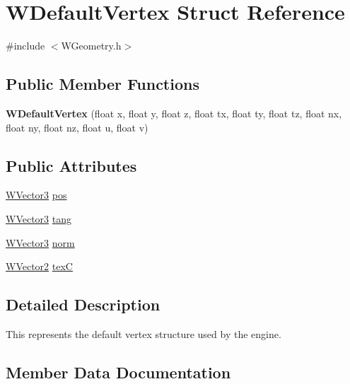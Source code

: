 \hypertarget{struct_w_default_vertex}{}\section{W\+Default\+Vertex Struct Reference}
\label{struct_w_default_vertex}


{\ttfamily \#include $<$W\+Geometry.\+h$>$}

\subsection*{Public Member Functions}
\begin{DoxyCompactItemize}
\item 
{\bfseries W\+Default\+Vertex} (float x, float y, float z, float tx, float ty, float tz, float nx, float ny, float nz, float u, float v)\hypertarget{struct_w_default_vertex_a119df88c3ef93fd08ce657af30c08669}{}\label{struct_w_default_vertex_a119df88c3ef93fd08ce657af30c08669}

\end{DoxyCompactItemize}
\subsection*{Public Attributes}
\begin{DoxyCompactItemize}
\item 
\hyperlink{class_w_vector3}{W\+Vector3} \hyperlink{struct_w_default_vertex_afdcf7f42cc5581df2f6952aaf839e8bb}{pos}
\item 
\hyperlink{class_w_vector3}{W\+Vector3} \hyperlink{struct_w_default_vertex_a2220549f6c898e6fdc5f534630c44796}{tang}
\item 
\hyperlink{class_w_vector3}{W\+Vector3} \hyperlink{struct_w_default_vertex_a60a322ede7963e1e4a3f6e031c303ffa}{norm}
\item 
\hyperlink{class_w_vector2}{W\+Vector2} \hyperlink{struct_w_default_vertex_a3e58deb0c88b8adaa8423aebd8427172}{texC}
\end{DoxyCompactItemize}


\subsection{Detailed Description}
This represents the default vertex structure used by the engine. 

\subsection{Member Data Documentation}
